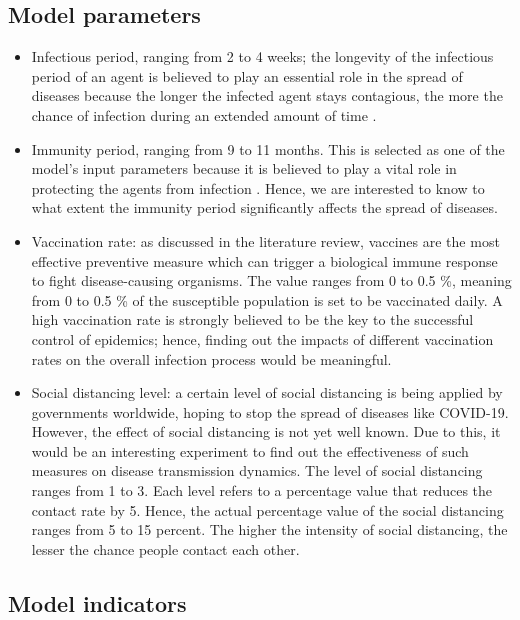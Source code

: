\documentclass[smallextended]{svjour3}       %
\begin{document}
\subsection{Model parameters}

\begin{itemize}
	\item Infectious period, ranging from 2 to 4 weeks; the longevity of the infectious period of an agent is believed to play an essential role in the spread of diseases because the longer the infected agent stays contagious, the more the chance of infection during an extended amount of time \cite{wilkinson2018impact}.
	\item Immunity period, ranging from 9 to 11 months. This is selected as one of the model’s input parameters because it is believed to play a vital role in protecting the agents from infection \cite{reyes2016modeling}. Hence, we are interested to know to what extent the immunity period significantly affects the spread of diseases.
	\item Vaccination rate: as discussed in the literature review, vaccines are the most effective preventive measure which can trigger a biological immune response to fight disease-causing organisms. The value ranges from 0 to 0.5 \%, meaning from 0 to 0.5 \% of the susceptible population is set to be vaccinated daily. A high vaccination rate is strongly believed to be the key to the successful control of epidemics; hence, finding out the impacts of different vaccination rates on the overall infection process would be meaningful.
	\item Social distancing level: a certain level of social distancing is being applied by governments worldwide, hoping to stop the spread of diseases like COVID-19. However, the effect of social distancing is not yet well known. Due to this, it would be an interesting experiment to find out the effectiveness of such measures on disease transmission dynamics. The level of social distancing ranges from 1 to 3. Each level refers to a percentage value that reduces the contact rate by 5. Hence, the actual percentage value of the social distancing ranges from 5 to 15 percent. The higher the intensity of social distancing, the lesser the chance people contact each other.
\end{itemize}



\subsection{Model indicators}
\end{document}
